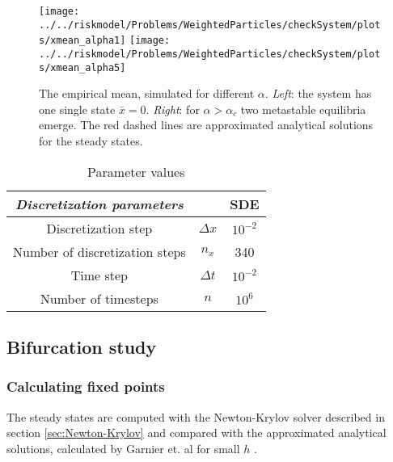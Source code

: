 \documentclass[]{article}
\begin{document}
\begin{center}
\begin{figure}
\texttt{[image: ../../riskmodel/Problems/WeightedParticles/checkSystem/plots/xmean\_alpha1]}
\texttt{[image: ../../riskmodel/Problems/WeightedParticles/checkSystem/plots/xmean\_alpha5]}

\caption{The empirical mean, simulated for different $\alpha$. \textit{Left}: the system has one single state $\bar{x}=0$. \textit{Right}: for $\alpha> \alpha_c$ two metastable equilibria emerge. 
 The red dashed lines are approximated  analytical solutions for the steady states. \label{fig:sysrisk}}
\end{figure}
\end{center}


 \begin{center}
\begin{table}
\caption{Parameter values}
  \begin{tabular} { | c  c | c |}    \hline   
   \textit{ {Discretization parameters}}&    &  SDE    \\ \hline
    Discretization step  & $\Delta x $  & $10^{-2}$ \\ 
        Number of discretization steps  & $n_x$ &  340 \\ 
    Time step  &  $\Delta t$ &   $10^{-2}$ \\ 
       Number of timesteps  & $n$  &  $10^{6}$ \\ \hline
  \end{tabular}
\end{table}
\end{center}

\subsection{Bifurcation study}

\subsubsection{Calculating fixed points}
The steady  states are computed with the Newton-Krylov solver described in section \ref{sec:Newton-Krylov} and compared with the approximated analytical solutions, calculated by Garnier et. al for small $h$ \cite{Garnier}.
\end{document}
